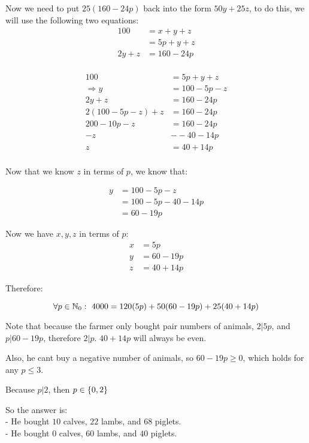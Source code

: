 \documentclass[12pt]{article} %
\begin{document}
\begin{homeworkProblem}
    Now we need to put $25(160 - 24p)$ back into the form $50y + 25z$, to do this, we will use the following two equations:
    \begin{align*}
        100    & = x + y + z  \\
               & = 5p + y + z \\
        2y + z & = 160 - 24p  \\
    \end{align*}

    \begin{align*}
        100                  & = 5p + y + z    \\
        \Rightarrow y        & = 100 - 5p -  z \\
        2y + z               & = 160 - 24p     \\
        2(100 - 5p -  z) + z & = 160 - 24p     \\
        200 - 10p -  z       & = 160 - 24p     \\
        - z                  & - -40 - 14 p    \\
        z                    & = 40 + 14p      \\
    \end{align*}

    Now that we know $z$ in terms of $p$, we know that:

    \begin{align*}
        y & = 100 - 5p -  z      \\
          & = 100 - 5p -40 - 14p \\
          & = 60 - 19p
    \end{align*}

    Now we have $x, y, z$ in terms of $p$:
    \begin{align*}
        x & = 5p       \\
        y & = 60 - 19p \\
        z & = 40 + 14p
    \end{align*}

    Therefore:

    $$
        \forall p \in \mathbb{N}_0: \ 4000 = 120(5p) + 50(60 - 19p) + 25(40 + 14p)
    $$

    Note that because the farmer only bought pair numbers of animals, $2 | 5p$, and $p | 60 - 19p$, therefore $2 | p$. $40 + 14p$ will always be even.

    Also, he cant buy a negative number of animals, so $60 - 19p \geq 0$, which holds for any $p \leq 3$.

    Because $p | 2$, then $p \in \left\{0, 2\right\}$

    So the answer is: \\
    - He bought $10$ calves, $22$ lambs, and $68$ piglets. \\
    - He bought $0$ calves, $60$ lambs, and $40$ piglets.
\end{homeworkProblem}
\end{document}
